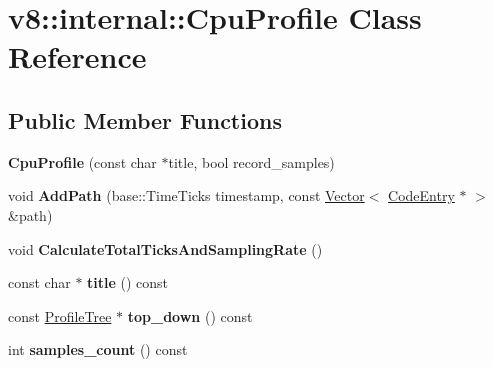 \hypertarget{classv8_1_1internal_1_1_cpu_profile}{}\section{v8\+:\+:internal\+:\+:Cpu\+Profile Class Reference}
\label{classv8_1_1internal_1_1_cpu_profile}
\subsection*{Public Member Functions}
\begin{DoxyCompactItemize}
\item 
\hypertarget{classv8_1_1internal_1_1_cpu_profile_a49007315194c4795f3e111021adfcbef}{}{\bfseries Cpu\+Profile} (const char $\ast$title, bool record\+\_\+samples)\label{classv8_1_1internal_1_1_cpu_profile_a49007315194c4795f3e111021adfcbef}

\item 
\hypertarget{classv8_1_1internal_1_1_cpu_profile_aa6f41fb79097c071d1a7af6497590e5c}{}void {\bfseries Add\+Path} (base\+::\+Time\+Ticks timestamp, const \hyperlink{classv8_1_1internal_1_1_vector}{Vector}$<$ \hyperlink{classv8_1_1internal_1_1_code_entry}{Code\+Entry} $\ast$ $>$ \&path)\label{classv8_1_1internal_1_1_cpu_profile_aa6f41fb79097c071d1a7af6497590e5c}

\item 
\hypertarget{classv8_1_1internal_1_1_cpu_profile_a67be15ade6a71de1c77bb568e9180d03}{}void {\bfseries Calculate\+Total\+Ticks\+And\+Sampling\+Rate} ()\label{classv8_1_1internal_1_1_cpu_profile_a67be15ade6a71de1c77bb568e9180d03}

\item 
\hypertarget{classv8_1_1internal_1_1_cpu_profile_a0634fcde82c4f1699dc026034438f46b}{}const char $\ast$ {\bfseries title} () const \label{classv8_1_1internal_1_1_cpu_profile_a0634fcde82c4f1699dc026034438f46b}

\item 
\hypertarget{classv8_1_1internal_1_1_cpu_profile_a220ed4be019cefa14c9efcacbcf1e0d4}{}const \hyperlink{classv8_1_1internal_1_1_profile_tree}{Profile\+Tree} $\ast$ {\bfseries top\+\_\+down} () const \label{classv8_1_1internal_1_1_cpu_profile_a220ed4be019cefa14c9efcacbcf1e0d4}

\item 
\hypertarget{classv8_1_1internal_1_1_cpu_profile_a4ef585c002c36e0ca8aaa8ec41ab5821}{}int {\bfseries samples\+\_\+count} () const \label{classv8_1_1internal_1_1_cpu_profile_a4ef585c002c36e0ca8aaa8ec41ab5821}


\end{DoxyCompactItemize}
